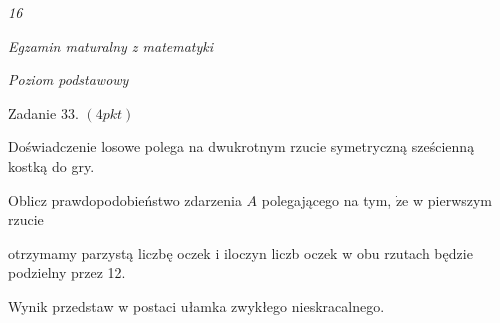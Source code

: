 \documentclass[a4paper,12pt]{article}
\begin{document}
{\it 16}

{\it Egzamin maturalny z matematyki}

{\it Poziom podstawowy}

Zadanie 33. $(4pkt)$

Doświadczenie losowe polega na dwukrotnym rzucie symetryczną sześcienną kostką do gry.

Oblicz prawdopodobieństwo zdarzenia $A$ polegającego na tym, $\dot{\mathrm{z}}\mathrm{e}$ w pierwszym rzucie

otrzymamy parzystą liczbę oczek i iloczyn liczb oczek w obu rzutach będzie podzielny przez 12.

Wynik przedstaw w postaci ułamka zwykłego nieskracalnego.
\end{document}
